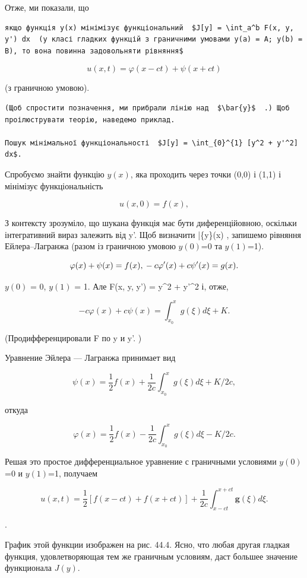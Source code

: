 \documentclass[
  ukrainian,
]{article}
\begin{document}
Отже, ми показали, що

\begin{verbatim}
якщо функція y(x) мінімізує функціональний  $J[y] = \int_a^b F(x, y, y') dx  (у класі гладких функцій з граничними умовами y(a) = A; y(b) = B), то вона повинна задовольняти рівняння$
\end{verbatim}

\[
u(x, t) = \varphi(x - ct) + \psi(x + ct)
\]

(з граничною умовою).

\begin{verbatim}
(Щоб спростити позначення, ми прибрали лінію над  $\bar{y}$  .) Щоб проілюструвати теорію, наведемо приклад.

Пошук мінімальної функціональності  $J[y] = \int_{0}^{1} [y^2 + y'^2] dx$.
\end{verbatim}

Спробуємо знайти функцію \(y(x)\), яка проходить через точки (0,0) і
(1,1) і мінімізує функціональність

\[
u(x, 0) = f(x),
\]

З контексту зрозуміло, що шукана функція має бути диференційовною,
оскільки інтегративний вираз залежить від y'. Щоб визначити \bar\{y\}(x)
, запишемо рівняння Ейлера--Лагранжа (разом із граничною умовою
\(y(0)\)=0 та \(y(1)\)=1).

\[
\varphi(x) + \psi(x) = f(x), \\ -c\varphi'(x) + c\psi'(x) = g(x).
\]

\(y(0)\) = 0, \(y(1)\) = 1. Але F(x, y, y') = y\^{}2 + y'\^{}2 і, отже,

\[
-c\varphi(x) + c\psi(x) = \int_{x_0}^{x} g(\xi) d\xi + K.
\]

(Продифференцировали F по y и y'. )

Уравнение Эйлера --- Лагранжа принимает вид

\[
\psi(x) = \frac{1}{2} f(x) + \frac{1}{2c} \int_{x_0}^{x} g(\xi) d\xi + K/2c,
\]

откуда

\[
\varphi(x) = \frac{1}{2} f(x) - \frac{1}{2c} \int_{x_0}^{x} g(\xi) d\xi - K/2c.
\]

Решая это простое дифференциальное уравнение с граничными условиями
\(y(0)\)=0 и \(y(1)\)=1, получаем

\[
u(x, t) = \frac{1}{2} \left[ f(x-ct) + f(x+ct) \right] + \frac{1}{2c} \int_{x-ct}^{x+ct} \mathbf{g}(\xi) d\xi.
\]

.

График этой функции изображен на рис. 44.4. Ясно, что любая другая
гладкая функция, удовлетворяющая тем же граничным условиям, даст большее
значение функционала \(J(y)\).
\end{document}

